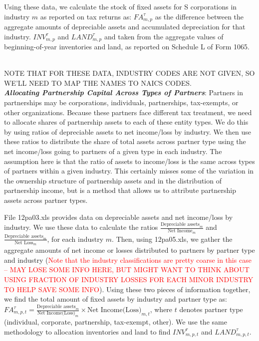 \documentclass[article,11pt,letterpaper,fleqn]{article}
\theoremstyle{definition}
\numberwithin{equation}{section}
\begin{document}
Using these data, we calculate the stock of fixed assets for S corporations in industry $m$ as reported on tax returns as: ${FA}^{\tau}_{m,p}$ as the difference between the aggregate amounts of depreciable assets and accumulated depreciation for that industry.  ${INV}^{\tau}_{m,p}$ and ${LAND}^{\tau}_{m,p}$ and taken from the aggregate values of beginning-of-year inventories and land, as reported on Schedule L of Form 1065.

\ \\
NOTE THAT FOR THESE DATA, INDUSTRY CODES ARE NOT GIVEN, SO WE'LL NEED TO MAP THE NAMES TO NAICS CODES.
\ \\
 
\textbf{\emph{Allocating Partnership Capital Across Types of Partners}}: Partners in partnerships may be corporations, individuals, partnerships, tax-exempts, or other organizations.  Because these partners face different tax treatment, we need to allocate shares of partnership assets to each of these entity types.  We do this by using ratios of depreciable assets to net income/loss by industry.  We then use these ratios to distribute the share of total assets across partner type using the net income/loss going to partners of a given type in each industry.  The assumption here is that the ratio of assets to income/loss is the same across types of partners within a given industry.  This certainly misses some of the variation in the ownership structure of partnership assets and in the distribution of partnership income, but is a method that allows us to attribute partnership assets across partner types.

File 12pa03.xls provides data on depreciable assets and net income/loss by industry.  We use these data to calculate the ratios $\frac{\text{Depreciable assets}_{m}}{\text{Net Income}_{m}}$ and $\frac{\text{Depreciable assets}_{m}}{\text{Net Loss}_{m}}$, for each industry $m$.  Then, using 12pa05.xls, we gather the aggregate amounts of net income or losses distributed to partners by partner type and industry (\textcolor{red}{Note that the industry classifications are pretty coarse in this case -- MAY LOSE SOME INFO HERE, BUT MIGHT WANT TO THINK ABOUT USING FRACTION OF INDUSTRY LOSSES FOR EACH MINOR INDUSTRY TO HELP SAVE SOME INFO}).  Using these two pieces of information together, we find the total amount of fixed assets by industry and partner type as:  ${FA}^{\tau}_{m,p,t}= \frac{\text{Depreciable assets}_{m}}{\text{Net Income(Loss)}_{m}} \times \text{Net Income(Loss)}_{m,t}$, where $t$ denotes partner type (individual, corporate, partnership, tax-exempt, other). We use the same methodology to allocation inventories and land to find ${INV}^{\tau}_{m,p,t}$ and ${LAND}^{\tau}_{m,p,t}$.
\end{document}
